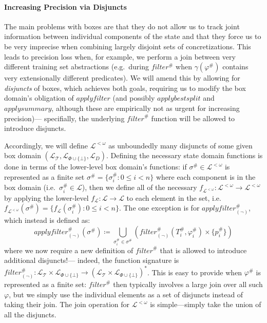 \paragraph{Increasing Precision via Disjuncts}
The main problems with boxes are
\rone that they do not allow us to track joint information
between individual components of the state and
\rtwo that they force us to be very imprecise when combining
largely disjoint sets of concretizations.
This leads to precision loss when, for example,
we perform a join between very different training set abstractions
(e.g.\ during $\mathit{filter^\#}$ when $\gamma(\varphi^\#)$
contains very extensionally different predicates).
We will amend this by
\rone allowing for \emph{disjuncts} of boxes,
which achieves both goals, requiring us to
\rtwo modify the box domain's obligation of $\mathit{applyfilter}$
(and possibly $\mathit{applybestsplit}$ and $\mathit{applysummary}$,
although these are empirically not as urgent for increasing precision)---%
specifially, the underlying $\mathit{filter}^\#$ function
will be allowed to introduce disjuncts.

Accordingly, we will define $\mathcal{L}^{<\omega}$ as
unboundedly many disjuncts of some given box domain
$(\mathcal{L}_\mathcal{T}, \mathcal{L}_{\Phi\cup\{\bot\}}, \mathcal{L}_D)$.
Defining the necessary state domain functions is done in terms of the
lower-level box domain's functions:
if $\sigma^\# \in \mathcal{L}^{<\omega}$ is represented as a finite set
$\sigma^\# = \{\sigma^\#_i : 0 \leq i < n\}$ where each component is in the box domain
(i.e.\ $\sigma^\#_i \in \mathcal{L}$),
then we define all of the necessary $f_{\mathcal{L}^{<\omega}} : \mathcal{L}^{<\omega} \rightarrow \mathcal{L}^{<\omega}$
by applying the lower-level $f_{\mathcal{L}} : \mathcal{L} \rightarrow \mathcal{L}$
to each element in the set,
i.e.\ $f_{\mathcal{L}^{<\omega}}(\sigma^\#) = \{f_{\mathcal{L}}(\sigma^\#_i) : 0 \leq i < n\}$.
The one exception is for $\mathit{applyfilter}^\#_{(\lnot)}$, which instead is defined as:
\[
    \mathit{applyfilter}^\#_{(\lnot)}(\sigma^\#) \coloneqq
    \bigcup_{\sigma^\#_i \in \sigma^\#} (\mathit{filter}^\#_{(\lnot)}(T^\#_i, \varphi^\#_i) \times \{p^\#_i\})
\]
where we now require a new definition of $\mathit{filter}^\#$
that is allowed to introduce additional disjuncts!---%
indeed, the function signature is
$\mathit{filter}^\#_{(\lnot)} : \mathcal{L}_\mathcal{T} \times \mathcal{L}_{\Phi\cup\{\bot\}}
\rightarrow (\mathcal{L}_\mathcal{T} \times \mathcal{L}_{\Phi\cup\{\bot\}})^*$.
This is easy to provide when $\varphi^\#$ is represented as a finite set:
$\mathit{filter}^\#$ then typically involves a large join over all such $\varphi$,
but we simply use the individual elements as a set of disjuncts instead of taking their join.
The join operation for $\mathcal{L}^{<\omega}$ is simple---simply take the union of all the disjuncts.

